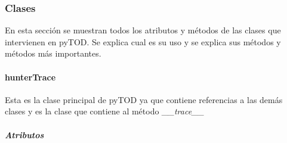\documentclass[12pt,legalpaper]{report}
\begin{document}
			\subsubsection{Clases}
			
En esta sección se muestran todos los atributos y métodos de las clases que intervienen en pyTOD.  Se explica cual es su uso y se explica sus métodos y métodos más importantes.			

				\paragraph{hunterTrace}
				
Esta es la clase principal de pyTOD ya que contiene referencias a las demás clases y es la clase que contiene al método \textit{\_\_trace\_\_}

					\subparagraph{Atributos}
					
\end{document}
